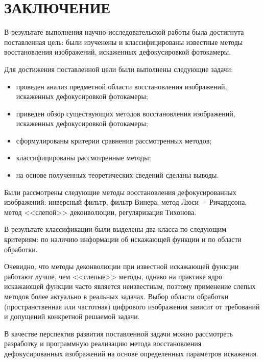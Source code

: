 \chapter*{ЗАКЛЮЧЕНИЕ}

В результате выполнения научно-исследовательской работы была достигнута поставленная цель: были изученены и классифицированы известные методы восстановления изображений, искаженных дефокусировкой фотокамеры.

Для достижения поставленной цели были выполнены следующие задачи: 

\begin{itemize}
	\item проведен анализ предметной области восстановления изображений, искаженных дефокусировкой фотокамеры;
	\item приведен обзор существующих методов восстановления изображений, искаженных дефокусировкой фотокамеры;
	\item сформулированы критерии сравнения рассмотренных методов;
	\item классифицированы рассмотренные методы;
	\item на основе полученных теоретических сведений сделаны выводы.
\end{itemize}

Были рассмотрены следующие методы восстановления дефокусированных изображений: инверсный фильтр, фильтр Винера, метод Люси~--~Ричардсона, метод <<слепой>> деконволюции, регуляризация Тихонова. 

В результате классификации были выделены два класса по следующим критериям: по наличию информации об искажающей функции и по области обработки.
 
Очевидно, что методы деконволюции при известной искажающей функции работают лучше, чем <<слепые>> методы, однако на практике ядро искажающей функции часто является неизвестным, поэтому применение слепых методов более актуально в реальных задачах. Выбор области обработки (пространственная или частотная) цифрового изображения зависит от требований и допущений конкретной решаемой задачи.

В качестве перспектив развития поставленной задачи можно рассмотреть разработку и программную реализацию метода восстановления дефокусированных изображений на основе определенных параметров искажения.